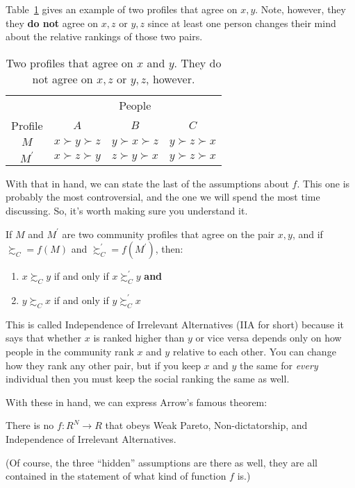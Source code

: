 Table~\ref{t:sc-agreement} gives an example of two profiles that agree on $x,y$.  Note, however, they they {\bf do not} agree on $x, z$ or $y, z$ since at least one person changes their mind about the relative rankings of those two pairs.
\begin{table}
    \centering
\begin{tabular}{cccc}
    \toprule
     & \multicolumn{3}{c}{People} \\
Profile           & $A$ & $B$ & $C$ \\
           \midrule
$M$        & $x \succ y \succ z$ & $y \succ x \succ z$ & $y \succ z \succ x$ \\
$M^\prime$ & $x \succ z \succ y$ & $z \succ y \succ x$ & $y \succ z \succ x$ \\
\bottomrule
\end{tabular}
\medskip
\caption{Two profiles that agree on $x$ and $y$. They do not agree on $x, z$ or $y, z$, however.}
\label{t:sc-agreement}
\end{table}

With that in hand, we can state the last of the assumptions about $f$. This one is probably the most controversial, and the one we will spend the most time discussing.  So, it's worth making sure you understand it.

\begin{definition}
If $M$ and $M^\prime$ are two community profiles that agree on the pair $x, y$, and if $\succsim_C = f(M)$ and $\succsim_C^\prime = f(M^\prime)$, then:
\begin{enumerate} 
\item $x \succsim_C y$ if and only if $x \succsim_C^\prime y$ {\bf and}
\item $y \succsim_C x$ if and only if $y \succsim_C^\prime x$ 
\end{enumerate}
\end{definition}

This is called Independence of Irrelevant Alternatives (IIA for short) because it says that whether $x$ is ranked higher than $y$ or vice versa depends only on how people in the community rank $x$ and $y$ relative to each other.  You can change how they rank any other pair, but if you keep $x$ and $y$ the same for {\it every} individual then you must keep the social ranking the same as well.

With these in hand, we can express Arrow's famous theorem:
\begin{proposition}
There is no $f: R^N \to R$ that obeys Weak Pareto, Non-dictatorship, and Independence of Irrelevant Alternatives.
\end{proposition}
(Of course, the three ``hidden'' assumptions are there as well, they are all contained in the statement of what kind of function $f$ is.)

